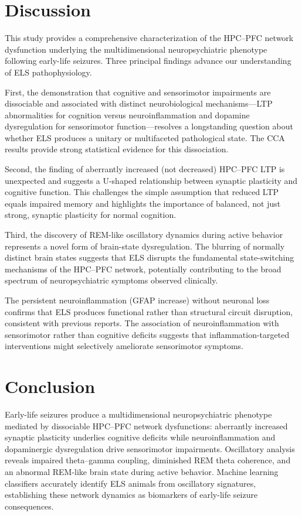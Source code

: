 \documentclass[11pt]{article}
\begin{document}
\section{Discussion}

This study provides a comprehensive characterization of the HPC--PFC network dysfunction underlying the multidimensional neuropsychiatric phenotype following early-life seizures. Three principal findings advance our understanding of ELS pathophysiology.

First, the demonstration that cognitive and sensorimotor impairments are dissociable and associated with distinct neurobiological mechanisms---LTP abnormalities for cognition versus neuroinflammation and dopamine dysregulation for sensorimotor function---resolves a longstanding question about whether ELS produces a unitary or multifaceted pathological state. The CCA results provide strong statistical evidence for this dissociation.

Second, the finding of aberrantly increased (not decreased) HPC--PFC LTP is unexpected and suggests a U-shaped relationship between synaptic plasticity and cognitive function. This challenges the simple assumption that reduced LTP equals impaired memory and highlights the importance of balanced, not just strong, synaptic plasticity for normal cognition.

Third, the discovery of REM-like oscillatory dynamics during active behavior represents a novel form of brain-state dysregulation. The blurring of normally distinct brain states suggests that ELS disrupts the fundamental state-switching mechanisms of the HPC--PFC network, potentially contributing to the broad spectrum of neuropsychiatric symptoms observed clinically.

The persistent neuroinflammation (GFAP increase) without neuronal loss confirms that ELS produces functional rather than structural circuit disruption, consistent with previous reports. The association of neuroinflammation with sensorimotor rather than cognitive deficits suggests that inflammation-targeted interventions might selectively ameliorate sensorimotor symptoms.

\section{Conclusion}

Early-life seizures produce a multidimensional neuropsychiatric phenotype mediated by dissociable HPC--PFC network dysfunctions: aberrantly increased synaptic plasticity underlies cognitive deficits while neuroinflammation and dopaminergic dysregulation drive sensorimotor impairments. Oscillatory analysis reveals impaired theta--gamma coupling, diminished REM theta coherence, and an abnormal REM-like brain state during active behavior. Machine learning classifiers accurately identify ELS animals from oscillatory signatures, establishing these network dynamics as biomarkers of early-life seizure consequences.



\end{document}
